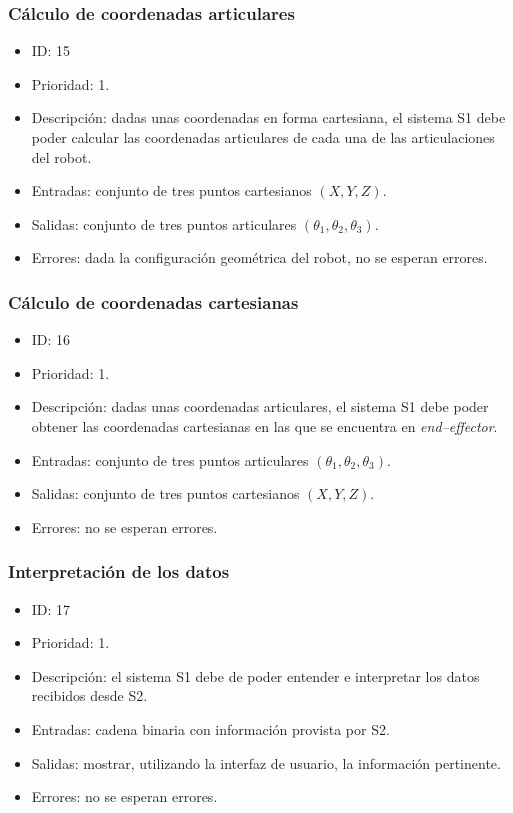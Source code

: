 \subsubsection{Cálculo de coordenadas articulares}
\begin{itemize}
    \item ID: 15
    \item Prioridad: 1.
    \item Descripción: dadas unas coordenadas en forma cartesiana, el sistema \ac{S1} debe poder calcular las coordenadas articulares de cada una de las articulaciones del robot.
    \item Entradas: conjunto de tres puntos cartesianos $(X,Y,Z)$.
    \item Salidas: conjunto de tres puntos articulares $(\theta_1, \theta_2, \theta_3)$.
    \item Errores: dada la configuración geométrica del robot, no se esperan errores.
\end{itemize}

\subsubsection{Cálculo de coordenadas cartesianas}
\begin{itemize}
    \item ID: 16
    \item Prioridad: 1.
    \item Descripción: dadas unas coordenadas articulares, el sistema \ac{S1} debe poder obtener las coordenadas cartesianas en las que se encuentra en \textit{end--effector}.
    \item Entradas: conjunto de tres puntos articulares $(\theta_1, \theta_2, \theta_3)$.
    \item Salidas: conjunto de tres puntos cartesianos $(X,Y,Z)$.
    \item Errores: no se esperan errores.
\end{itemize}

\subsubsection{Interpretación de los datos}
\begin{itemize}
    \item ID: 17
    \item Prioridad: 1.
    \item Descripción: el sistema \ac{S1} debe de poder entender e interpretar los datos recibidos desde \ac{S2}.
    \item Entradas: cadena binaria con información provista por \ac{S2}.
    \item Salidas: mostrar, utilizando la interfaz de usuario, la información pertinente.
    \item Errores: no se esperan errores.
\end{itemize}

